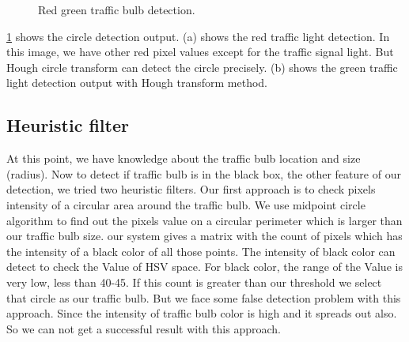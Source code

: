 \begin{figure}[!ht]
\centering
{}

\caption{Red green traffic bulb detection.}
\label{f:cir_img}
\end{figure}

\ref{f:cir_img} shows the circle detection output.
(a) shows the red traffic light detection.
In this image, we have other red pixel values except for the traffic signal light.
But Hough circle transform can detect the circle precisely.
(b) shows the green traffic light detection output with Hough transform method.

\subsection{Heuristic filter}
At this point, we have knowledge about the traffic bulb location and size (radius).
Now to detect if traffic bulb is in the black box, the other feature of our detection, we tried two heuristic filters.
Our first approach is to check pixels intensity of a circular area around the traffic bulb.
We use midpoint circle algorithm to find out the pixels value on a circular perimeter which is larger than our traffic bulb size.
our system gives a matrix with the count of pixels which has the intensity of a black color of all those points.
The intensity of black color can detect to check the Value of HSV space.
For black color, the range of the Value is very low, less than 40-45.
If this count is greater than our threshold we select that circle as our traffic bulb.
But we face some false detection problem with this approach.
Since the intensity of traffic bulb color is high and it spreads out also.
So we can not get a successful result with this approach.

